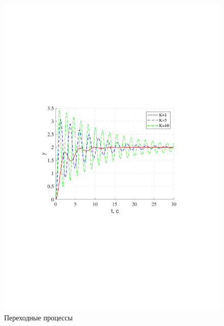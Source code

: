 \documentclass[a4paper,12pt]{article}
\begin{document}
	\begin{figure}[h!]
		\begin{center}
		\renewcommand{\figurename}{Рисунок}
		\includegraphics[width=5in]{ph1ast1MOD.pdf}
		\caption{Переходные процессы} 
		\label{s_8}
		\end{center}
	\end{figure} 
\end{document}
